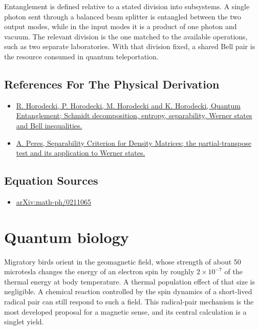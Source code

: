 \documentclass[11pt,oneside]{book}
\begin{document}
Entanglement is defined relative to a stated division into subsystems. A single photon sent through a balanced beam splitter is entangled between the two output modes, while in the input modes it is a product of one photon and vacuum. The relevant division is the one matched to the available operations, such as two separate laboratories. With that division fixed, a shared Bell pair is the resource consumed in quantum teleportation.

\subsection*{References For The Physical Derivation}
\begin{itemize}
\item \href{https://arxiv.org/abs/quant-ph/0702225}{R. Horodecki, P. Horodecki, M. Horodecki and K. Horodecki, Quantum Entanglement; Schmidt decomposition, entropy, separability, Werner states and Bell inequalities.}
\item \href{https://arxiv.org/abs/quant-ph/9604005}{A. Peres, Separability Criterion for Density Matrices; the partial-transpose test and its application to Werner states.}
\end{itemize}



\subsection*{Equation Sources}
\begin{itemize}
\item \href{https://arxiv.org/abs/math-ph/0211065}{arXiv:math-ph/0211065}
\end{itemize}

\clearpage

\section{Quantum biology}

\label{topic:quantum-biology}

Migratory birds orient in the geomagnetic field, whose strength of about 50 microtesla changes the energy of an electron spin by roughly \(2\times10^{-7}\) of the thermal energy at body temperature. A thermal population effect of that size is negligible. A chemical reaction controlled by the spin dynamics of a short-lived radical pair can still respond to such a field. This radical-pair mechanism is the most developed proposal for a magnetic sense, and its central calculation is a singlet yield.
\end{document}
